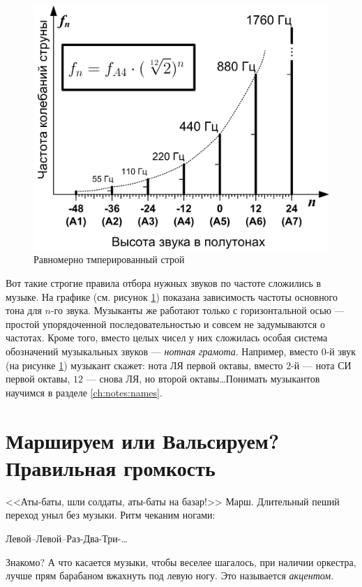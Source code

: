\begin{figure}[!ht]
    \centering
    \includegraphics{fig/tempered} 
    \caption{Равномерно тмперированный строй}\label{fig:music:tone:tempered}
\end{figure} 

Вот такие строгие правила отбора нужных звуков по частоте сложились в музыке. На графике (см. рисунок \ref{fig:music:tone:tempered}) показана зависимость частоты основного тона для $n$-го звука. Музыканты же работают только с горизонтальной осью --- простой упорядоченной последовательностью и совсем не задумываются о частотах. Кроме того, вместо целых чисел у них сложилась особая система обозначений музыкальных звуков --- \emph{нотная грамота}. Например, вместо $0$-й звук (на рисунке \ref{fig:music:tone:tempered}) музыкант скажет: нота ЛЯ первой октавы, вместо $2$-й --- нота СИ первой октавы, $12$ --- снова ЛЯ, но второй октавы\ldots Понимать музыкантов научимся в разделе \ref{ch:notes:names}.


\section{Маршируем или Вальсируем? Правильная громкость}
\label{ch:music:volume}

<<Аты-баты, шли солдаты, аты-баты на базар!>> Марш. Длительный пеший переход уныл без музыки. Ритм чеканим ногами: 
\begin{center}
    Левой--Левой--Раз-Два-Три-\ldots 
\end{center}
Знакомо? А что касается музыки, чтобы веселее шагалось, при наличии оркестра, лучше прям барабаном вжахнуть под левую ногу. Это называется \emph{акцентом}. 

